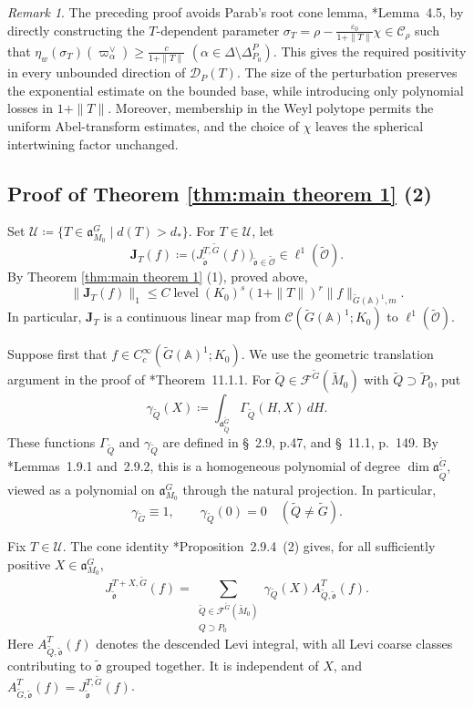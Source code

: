 \documentclass[12pt]{amsart}
\theoremstyle{definition}
\theoremstyle{plain}
\theoremstyle{remark}
\newtheorem{remark}[definition]{Remark}
\def\Q{\mathbb{Q}}%
\def\A{\mathbb{A}}%
\newcommand{\fa}{\mathfrak{a}}
\newcommand{\cC}{\mathcal{C}}
\newcommand{\cF}{\mathcal{F}}
\numberwithin{equation}{section}
\newcommand{\tG}{\widetilde{G}}
\newcommand{\tM}{\widetilde{M}}
\newcommand{\tP}{\widetilde{P}}
\newcommand{\tQ}{\widetilde{Q}}
\newcommand{\tfo}{\widetilde{\mathfrak{o}}}
\newcommand{\tcO}{\widetilde{\mathcal{O}}}
\newcommand{\sC}{\mathscr{C}}
\newcommand{\sU}{\mathscr{U}}
\newcommand{\level}{\operatorname{level}}
\begin{document}
\begin{remark}
The preceding proof avoids Parab's root cone lemma,
\cite{Par19}*{Lemma~4.5}, by directly constructing the
$T$-dependent parameter $\sigma_T=\rho-\frac{\varepsilon_0}{1+\|T\|}\chi
 \in\sC_\rho$ such that $\eta_w(\sigma_T)(\varpi_\alpha^\vee)
 \ge \frac{c}{1+\|T\|}$ $(\alpha\in\Delta\setminus\Delta_{P_0}^{P})$.
This gives the required positivity in every unbounded direction
of $\mathcal D_P(T)$.
The size of the perturbation preserves the exponential estimate
on the bounded base, while introducing only polynomial losses
in $1+\|T\|$.
Moreover, membership in the Weyl polytope permits the uniform
Abel-transform estimates, and the choice of $\chi$ leaves the
spherical intertwining factor unchanged.
\end{remark}


\subsection{Proof of Theorem \ref{thm:main theorem 1} (2)}
Set $\sU\coloneqq\{T\in \fa_{M_0}^G \mid d(T)>d_*\}$. 
For $T\in\mathscr U$, let
\[
 \mathbf J_T(f)
 \coloneqq \bigl(J_{\tfo}^{T,\tG}(f)\bigr)_{\tfo\in\tcO}
 \in\ell^1(\tcO).
\]
By Theorem \ref{thm:main theorem 1} (1), proved above,
\begin{equation}\label{eq:gr-polynomial-evaluation-bound}
 \|\mathbf J_T(f)\|_1
 \le C\level(K_0)^s(1+\|T\|)^r
       \|f\|_{\tG(\A)^1,m}.
\end{equation}
In particular, $\mathbf J_T$ is a continuous linear map from
$\cC(\tG(\A)^1;K_0)$ to $\ell^1(\tcO)$.

Suppose first that $f\in C_c^\infty(\tG(\A)^1;K_0)$.
We use the geometric translation argument in the proof of
\cite{LW13}*{Theorem~11.1.1}.
For $\tQ\in\cF^{\tG}(\tM_0)$ with $\tQ\supset\tP_0$, put
\[
 \gamma_{\tQ}(X)
 \coloneqq \int_{\fa_{\tQ}^{\tG}}\Gamma_{\tQ}(H,X)\,dH.
\]
These functions $\Gamma_{\tQ}$ and $\gamma_{\tQ}$ are defined in \cite{LW13} \S~2.9, p.47, and \S~11.1, p.~149.
By \cite{LW13}*{Lemmas~1.9.1 and~2.9.2}, this is a homogeneous
polynomial of degree $\dim\fa_{\tQ}^{\tG}$, viewed as a polynomial
on $\fa_{M_0}^G$ through the natural projection. In particular,
\[
 \gamma_{\tG}\equiv1,\qquad
 \gamma_{\tQ}(0)=0\quad(\tQ\ne\tG).
\]

Fix $T\in\mathscr U$. The cone identity
\cite{LW13}*{Proposition~2.9.4~(2)} gives, for all sufficiently positive $X\in \fa_{M_0}^G$,
\begin{equation}\label{eq:gr-polynomial-translation}
 J_{\tfo}^{T+X,\tG}(f)
 =\sum_{\substack{\tQ\in\cF^{\tG}(\tM_0)\\Q\supset P_0}}
   \gamma_{\tQ}(X)A_{\tQ,\tfo}^{T}(f).
\end{equation}
Here $A_{\tQ,\tfo}^{T}(f)$ denotes the descended Levi integral,
with all Levi coarse classes contributing to $\tfo$ grouped
together. It is independent of $X$, and $A_{\tG,\tfo}^{T}(f)=J_{\tfo}^{T,\tG}(f)$.
\end{document}
